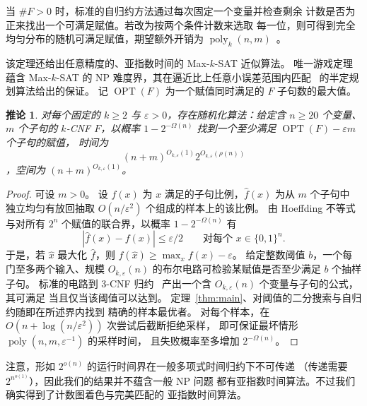\documentclass[11pt,reqno]{amsart}
\numberwithin{equation}{section}
\newtheorem{corollary}[theorem]{推论}
\theoremstyle{definition}\newtheorem{definition}[theorem]{定义}
\theoremstyle{remark}\newtheorem{remark}[theorem]{注}
\newcommand{\poly}{\operatorname{poly}}
\renewcommand{\le}{\leqslant}
\renewcommand{\ge}{\geqslant}
\begin{document}
当 $\#F>0$ 时，标准的自归约方法通过每次固定一个变量并检查剩余
计数是否为正来找出一个可满足赋值。若改为按两个条件计数来选取
每一位，则可得到完全均匀分布的随机可满足赋值，期望额外开销为
$\poly_k(n,m)$~\cite[Theorem~3.3(1)]{JVV86}。

该定理还给出任意精度的、亚指数时间的 Max-$k$-SAT 近似算法。
唯一游戏定理~\cite[Section~8.1]{OpenAIUGC26} 蕴含 Max-$k$-SAT
的 NP 难度界，其在逼近比上任意小误差范围内匹配~\cite{Rag08}
的半定规划算法给出的保证。
记 $\operatorname{OPT}(F)$ 为一个赋值同时满足的 $F$ 子句数的最大值。
\begin{corollary}\label{cor:max-sat-approximation}
对每个固定的 $k\ge2$ 与 $\varepsilon>0$，存在随机化算法：给定含
$n\ge20$ 个变量、$m$ 个子句的 $k$-CNF $F$，以概率
$1-2^{-\Omega(n)}$ 找到一个至少满足
$\operatorname{OPT}(F)-\varepsilon m$ 个子句的赋值，
时间为
\[
 (n+m)^{O_{k,\varepsilon}(1)}2^{O_{k,\varepsilon}(\rho(n))}
\]
，空间为 $(n+m)^{O_{k,\varepsilon}(1)}$。
\end{corollary}
\begin{proof}
可设 $m>0$。
设 $f(x)$ 为 $x$ 满足的子句比例，$\widehat f(x)$ 为从 $m$ 个子句中
独立均匀有放回抽取 $O(n/\varepsilon^2)$ 个组成的样本上的该比例。
由 Hoeffding 不等式与对所有 $2^n$ 个赋值的联合界，以概率
$1-2^{-\Omega(n)}$ 有
\[
 |\widehat f(x)-f(x)|\le\varepsilon/2
 \qquad\text{对每个 }x\in\{0,1\}^n.
\]
于是，若 $\widehat x$ 最大化 $\widehat f$，则
$f(\widehat x)\ge\max_x f(x)-\varepsilon$。
给定整数阈值 $b$，一个每门至多两个输入、规模
$O_{k,\varepsilon}(n)$ 的布尔电路可检验某赋值是否至少满足 $b$
个抽样子句。
标准的电路到 $3$-CNF 归约~\cite[Lemmas~15.9--15.10]{Bar23}
产出一个含 $O_{k,\varepsilon}(n)$ 个变量与子句的公式，其可满足
当且仅当该阈值可以达到。
定理~\ref{thm:main}、对阈值的二分搜索与自归约随即在所述界内找到
精确的样本最优者。
对每个样本，在 $O(n+\log(n/\varepsilon^2))$ 次尝试后截断拒绝采样，
即可保证最坏情形 $\poly(n,m,\varepsilon^{-1})$ 的采样时间，
且失败概率至多增加 $2^{-\Omega(n)}$。
\end{proof}

注意，形如 $2^{o(n)}$ 的运行时间界在一般多项式时间归约下不可传递
（传递需要 $2^{n^{o(1)}}$），因此我们的结果并不蕴含一般 NP 问题
都有亚指数时间算法。不过我们确实得到了计数图着色与完美匹配的
亚指数时间算法。
\end{document}

